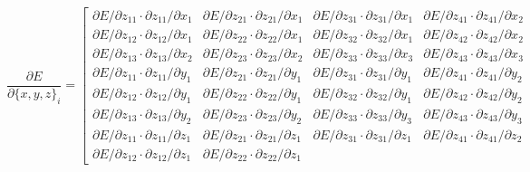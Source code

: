 \begin{equation}
\frac{\partial{E}}{\partial{\{x, y, z\}_i}} = \left[\begin{array}{cccc}
\partial{E} / \partial{z_{11}} \cdot \partial{z_{11}} / \partial{x_1} & 
\partial{E} / \partial{z_{21}} \cdot \partial{z_{21}} / \partial{x_1} &
\partial{E} / \partial{z_{31}} \cdot \partial{z_{31}} / \partial{x_1} & 
\partial{E} / \partial{z_{41}} \cdot \partial{z_{41}} / \partial{x_2} \\
\partial{E} / \partial{z_{12}} \cdot \partial{z_{12}} / \partial{x_1} & 
\partial{E} / \partial{z_{22}} \cdot \partial{z_{22}} / \partial{x_1} &
\partial{E} / \partial{z_{32}} \cdot \partial{z_{32}} / \partial{x_1} & 
\partial{E} / \partial{z_{42}} \cdot \partial{z_{42}} / \partial{x_2} \\
\partial{E} / \partial{z_{13}} \cdot \partial{z_{13}} / \partial{x_2} & 
\partial{E} / \partial{z_{23}} \cdot \partial{z_{23}} / \partial{x_2} &
\partial{E} / \partial{z_{33}} \cdot \partial{z_{33}} / \partial{x_3} & 
\partial{E} / \partial{z_{43}} \cdot \partial{z_{43}} / \partial{x_3} \\
\partial{E} / \partial{z_{11}} \cdot \partial{z_{11}} / \partial{y_1} & 
\partial{E} / \partial{z_{21}} \cdot \partial{z_{21}} / \partial{y_1} &
\partial{E} / \partial{z_{31}} \cdot \partial{z_{31}} / \partial{y_1} & 
\partial{E} / \partial{z_{41}} \cdot \partial{z_{41}} / \partial{y_2} \\
\partial{E} / \partial{z_{12}} \cdot \partial{z_{12}} / \partial{y_1} & 
\partial{E} / \partial{z_{22}} \cdot \partial{z_{22}} / \partial{y_1} &
\partial{E} / \partial{z_{32}} \cdot \partial{z_{32}} / \partial{y_1} & 
\partial{E} / \partial{z_{42}} \cdot \partial{z_{42}} / \partial{y_2} \\
\partial{E} / \partial{z_{13}} \cdot \partial{z_{13}} / \partial{y_2} & 
\partial{E} / \partial{z_{23}} \cdot \partial{z_{23}} / \partial{y_2} &
\partial{E} / \partial{z_{33}} \cdot \partial{z_{33}} / \partial{y_3} & 
\partial{E} / \partial{z_{43}} \cdot \partial{z_{43}} / \partial{y_3} \\
\partial{E} / \partial{z_{11}} \cdot \partial{z_{11}} / \partial{z_1} & 
\partial{E} / \partial{z_{21}} \cdot \partial{z_{21}} / \partial{z_1} &
\partial{E} / \partial{z_{31}} \cdot \partial{z_{31}} / \partial{z_1} & 
\partial{E} / \partial{z_{41}} \cdot \partial{z_{41}} / \partial{z_2} \\
\partial{E} / \partial{z_{12}} \cdot \partial{z_{12}} / \partial{z_1} & 
\partial{E} / \partial{z_{22}} \cdot \partial{z_{22}} / \partial{z_1} &

\end{array}
\end{equation}
